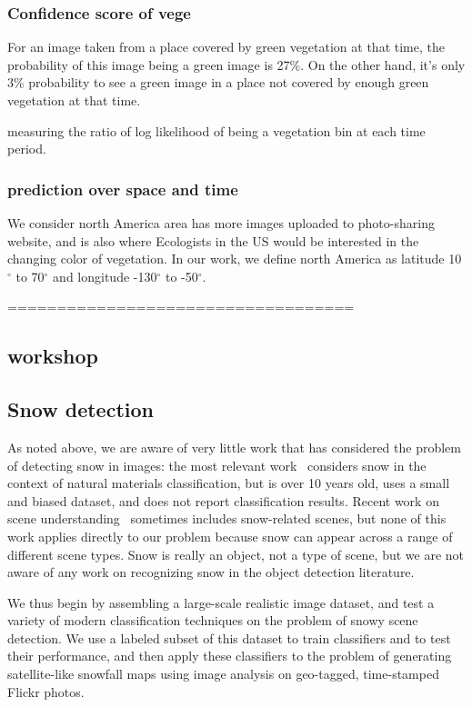 \subsubsection*{Confidence score of vege}


For an image taken from a place covered by green vegetation at that time, the probability of this image being a green image is 27\%. On the other hand, it's only 3\% probability to see a green image in a place not covered by enough green vegetation at that time.

measuring the ratio of log likelihood of being a vegetation bin at each time period.

\subsubsection*{prediction over space and time}

We consider north America area has more images uploaded to photo-sharing website, and is also where Ecologists in the US would be interested in the changing color of vegetation. In our work, we define north America as latitude 10$^{\circ}$ to 70$^{\circ}$ and longitude -130$^{\circ}$ to -50$^{\circ}$.



\hfill \break
\hfill \break
===================================
\hfill \break
\hfill \break
\subsection*{workshop}
\subsection{Snow detection}


As noted above, we are aware of very little work that has considered
the problem of detecting snow in images: the most relevant
work~\cite{singhal2003spatialcontext} considers snow in the context of
natural materials classification, but is over 10 years old, uses a
small and biased dataset, and does not report classification results.
Recent work on scene understanding~\cite{XiaoHEOT10} sometimes
includes snow-related scenes, but none of this work applies directly
to our problem because snow can appear across a range of different
scene types. Snow is really an object, not a type of scene, but we are
not aware of any work on recognizing snow in the object detection
literature.

We thus begin by assembling a large-scale realistic image dataset,
and test a variety of modern classification techniques on the
problem of snowy scene detection. We use a labeled subset of this
dataset to train classifiers and to test their performance, and then
apply these classifiers to the problem of generating satellite-like
snowfall maps using image analysis on geo-tagged, time-stamped
Flickr photos.

